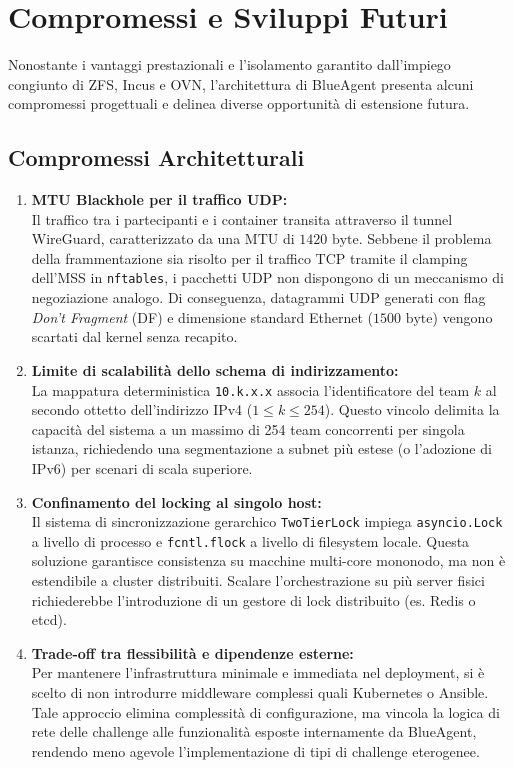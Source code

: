 \section{Compromessi e Sviluppi
Futuri}\label{compromessi-e-sviluppi-futuri}

Nonostante i vantaggi prestazionali e l'isolamento garantito
dall'impiego congiunto di ZFS, Incus e OVN, l'architettura di BlueAgent
presenta alcuni compromessi progettuali e delinea diverse opportunità di
estensione futura.

\subsection{Compromessi
Architetturali}\label{compromessi-architetturali}

\begin{enumerate}
\def\labelenumi{\arabic{enumi}.}
\item
  \textbf{MTU Blackhole per il traffico UDP:}\\
  Il traffico tra i partecipanti e i container transita attraverso il
  tunnel WireGuard, caratterizzato da una \(\text{MTU}\) di
  \(1420\text{ byte}\). Sebbene il problema della frammentazione sia
  risolto per il traffico TCP tramite il clamping dell'MSS in
  \passthrough{\lstinline!nftables!}, i pacchetti UDP non dispongono di
  un meccanismo di negoziazione analogo. Di conseguenza, datagrammi UDP
  generati con flag \emph{Don't Fragment} (DF) e dimensione standard
  Ethernet (\(1500\text{ byte}\)) vengono scartati dal kernel senza
  recapito.
\item
  \textbf{Limite di scalabilità dello schema di indirizzamento:}\\
  La mappatura deterministica \passthrough{\lstinline!10.k.x.x!} associa
  l'identificatore del team \(k\) al secondo ottetto dell'indirizzo IPv4
  (\(1 \le k \le 254\)). Questo vincolo delimita la capacità del sistema
  a un massimo di 254 team concorrenti per singola istanza, richiedendo
  una segmentazione a subnet più estese (o l'adozione di IPv6) per
  scenari di scala superiore.
\item
  \textbf{Confinamento del locking al singolo host:}\\
  Il sistema di sincronizzazione gerarchico
  \passthrough{\lstinline!TwoTierLock!} impiega
  \passthrough{\lstinline!asyncio.Lock!} a livello di processo e
  \passthrough{\lstinline!fcntl.flock!} a livello di filesystem locale.
  Questa soluzione garantisce consistenza su macchine multi-core
  mononodo, ma non è estendibile a cluster distribuiti. Scalare
  l'orchestrazione su più server fisici richiederebbe l'introduzione di
  un gestore di lock distribuito (es. Redis o etcd).
\item
  \textbf{Trade-off tra flessibilità e dipendenze esterne:}\\
  Per mantenere l'infrastruttura minimale e immediata nel deployment, si
  è scelto di non introdurre middleware complessi quali Kubernetes o
  Ansible. Tale approccio elimina complessità di configurazione, ma
  vincola la logica di rete delle challenge alle funzionalità esposte
  internamente da BlueAgent, rendendo meno agevole l'implementazione di
  tipi di challenge eterogenee.
\end{enumerate}

